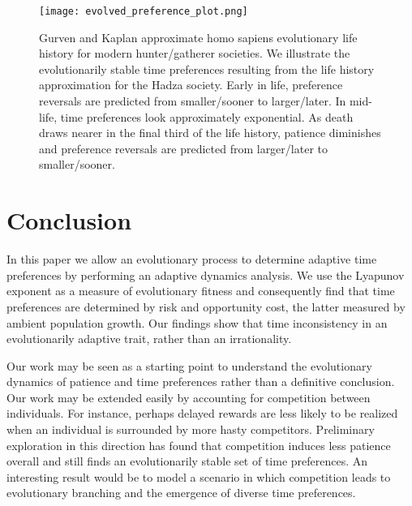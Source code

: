 \documentclass[titlepage, hidelinks, 12pt]{article}
\theoremstyle{plain}
\theoremstyle{remark}
\theoremstyle{definition}
\begin{document}
\begin{figure}[h]
    \centering
    \texttt{[image: evolved\_preference\_plot.png]}
    \caption[Induced time preferences from an average evolutionary life history.]{Gurven and Kaplan \cite{gurven07} approximate homo sapiens evolutionary life history for modern hunter/gatherer societies. 
    We illustrate the evolutionarily stable time preferences resulting from the life history approximation for the Hadza society. Early in life,
preference reversals are predicted from smaller/sooner to larger/later. In mid-life, time preferences look approximately exponential. As death
draws nearer in the final third of the life history, patience diminishes and preference reversals are predicted from larger/later to smaller/sooner.}
\end{figure}























\section{Conclusion}
In this paper we allow an evolutionary process to determine 
adaptive time preferences by performing an adaptive dynamics analysis. We use the Lyapunov exponent as 
a measure of evolutionary fitness and consequently find that time preferences are determined by risk and opportunity cost, the latter
measured by ambient population growth. Our findings show that time inconsistency in an evolutionarily adaptive trait, rather than an
irrationality. 

Our work may be seen as a starting point to understand the evolutionary dynamics of patience and time preferences rather
than a definitive conclusion. Our work may be extended easily by accounting for competition between individuals. For instance, perhaps
delayed rewards are less likely to be realized when an individual is surrounded by more hasty competitors. 
Preliminary exploration in this direction has found that competition induces less patience overall and still finds an evolutionarily stable
set of time preferences. An interesting result would be to model a scenario in which competition leads to evolutionary branching and the emergence
of diverse time preferences. 
\end{document}
